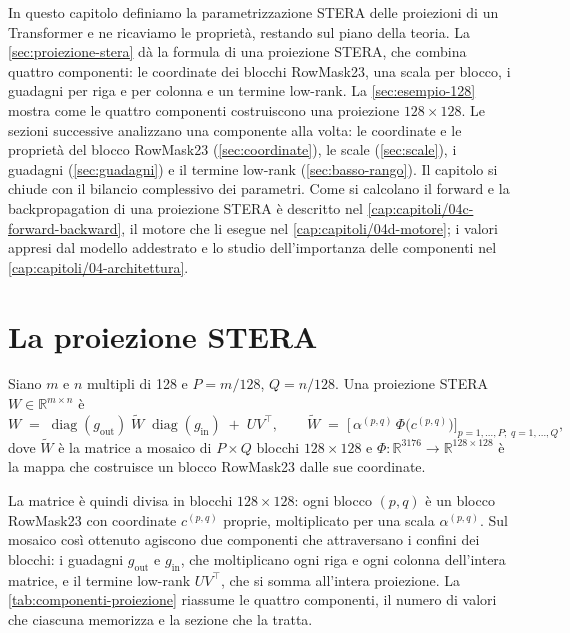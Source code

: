 In questo capitolo definiamo la parametrizzazione STERA delle proiezioni di un Transformer e ne ricaviamo le proprietà, restando sul piano della teoria. La \autoref{sec:proiezione-stera} dà la formula di una proiezione STERA, che combina quattro componenti: le coordinate dei blocchi RowMask23, una scala per blocco, i guadagni per riga e per colonna e un termine low-rank. La \autoref{sec:esempio-128} mostra come le quattro componenti costruiscono una proiezione $128\times128$. Le sezioni successive analizzano una componente alla volta: le coordinate e le proprietà del blocco RowMask23 (\autoref{sec:coordinate}), le scale (\autoref{sec:scale}), i guadagni (\autoref{sec:guadagni}) e il termine low-rank (\autoref{sec:basso-rango}). Il capitolo si chiude con il bilancio complessivo dei parametri. Come si calcolano il forward e la backpropagation di una proiezione STERA è descritto nel \autoref{cap:capitoli/04c-forward-backward}, il motore che li esegue nel \autoref{cap:capitoli/04d-motore}; i valori appresi dal modello addestrato e lo studio dell'importanza delle componenti nel \autoref{cap:capitoli/04-architettura}.

\section{La proiezione STERA}
\label{sec:proiezione-stera}

\begin{definizione}
\label{def:proiezione-stera}
Siano $m$ e $n$ multipli di 128 e $P=m/128$, $Q=n/128$. Una proiezione STERA $W\in\mathbb{R}^{m\times n}$ è
\[
W \;=\; \operatorname{diag}(g_{\mathrm{out}})\;\widetilde W\;\operatorname{diag}(g_{\mathrm{in}}) \;+\; U V^{\top},
\qquad
\widetilde W \;=\; \Big[\,\alpha^{(p,q)}\,\Phi\big(c^{(p,q)}\big)\Big]_{p=1,\dots,P;\;q=1,\dots,Q},
\]
dove $\widetilde W$ è la matrice a mosaico di $P\times Q$ blocchi $128\times128$ e $\Phi:\mathbb{R}^{3176}\to\mathbb{R}^{128\times128}$ è la mappa che costruisce un blocco RowMask23 dalle sue coordinate.
\end{definizione}

La matrice è quindi divisa in blocchi $128\times128$: ogni blocco $(p,q)$ è un blocco RowMask23 con coordinate $c^{(p,q)}$ proprie, moltiplicato per una scala $\alpha^{(p,q)}$. Sul mosaico così ottenuto agiscono due componenti che attraversano i confini dei blocchi: i guadagni $g_{\mathrm{out}}$ e $g_{\mathrm{in}}$, che moltiplicano ogni riga e ogni colonna dell'intera matrice, e il termine low-rank $UV^\top$, che si somma all'intera proiezione. La \autoref{tab:componenti-proiezione} riassume le quattro componenti, il numero di valori che ciascuna memorizza e la sezione che la tratta.

